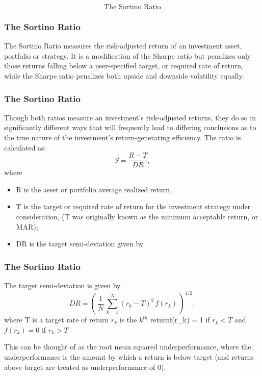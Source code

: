 \documentclass{beamer}
\begin{document}
\begin{frame}
\Large
\[
\mbox{The Sortino Ratio}
\]
\end{frame}

\begin{frame}

\frametitle{The Sortino Ratio}

The Sortino Ratio measures the risk-adjusted return of an investment asset, 
portfolio or strategy. It is a modification of the Sharpe ratio but penalizes only those returns falling below a user-specified target, or required rate of return, while the Sharpe ratio penalizes both upside and downside volatility equally. 
\end{frame}

\begin{frame}

\frametitle{The Sortino Ratio}
Though both ratios measure an investment's risk-adjusted returns, they do so in significantly different ways that will frequently lead to differing conclusions as to the true nature of the investment's return-generating efficiency. The ratio is calculated as:
\[S = \frac{R-T}{DR},\]
where 
\begin{itemize}
\item R is the asset or portfolio average realized return, 
\item T is the target or required rate of return for the investment strategy 
under consideration, (T was originally known as the minimum acceptable return, or MAR); 
\item DR is the target semi-deviation given by
\end{itemize}
\end{frame}

\begin{frame}

\frametitle{The Sortino Ratio}
The target semi-deviation is given by
\[ DR = \left( \, \frac{1}{N} \, \sum_{k=1}^N (r_k - T)^2\,f(r_k)\, \right)^{1/2},\] 
where
T is a target rate of return $r_k$ is the $k^{th}$ returnf(r_k) = 1  if $r_k < T$ and 
$f(r_k) = 0 $ if $r_k > T$

This can be thought of as the root mean squared underperformance, where the underperformance is the amount by which a return is below target (and returns above target are treated as underperformance of 0).

\end{frame}
\end{document}
